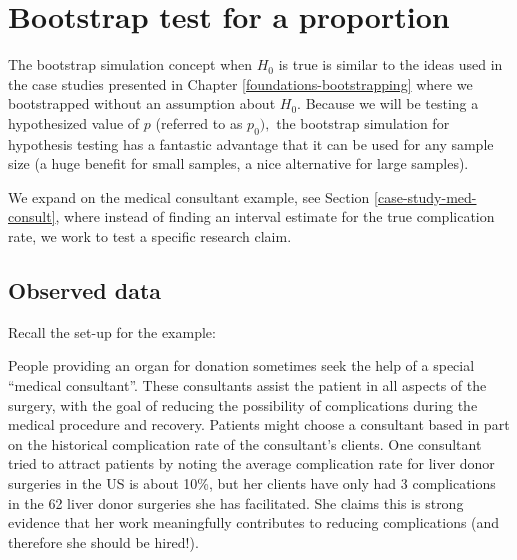 \documentclass[
  10pt,
  openany]{book}
\begin{document}
\vspace{-4mm}

\hypertarget{one-prop-null-boot}{%
\section{Bootstrap test for a proportion}\label{one-prop-null-boot}}

The bootstrap simulation concept when \(H_0\) is true is similar to the ideas used in the case studies presented in Chapter \ref{foundations-bootstrapping} where we bootstrapped without an assumption about \(H_0.\) Because we will be testing a hypothesized value of \(p\) (referred to as \(p_0),\) the bootstrap simulation for hypothesis testing has a fantastic advantage that it can be used for any sample size (a huge benefit for small samples, a nice alternative for large samples).

We expand on the medical consultant example, see Section \ref{case-study-med-consult}, where instead of finding an interval estimate for the true complication rate, we work to test a specific research claim.

\clearpage

\hypertarget{observed-data-7}{%
\subsection{Observed data}\label{observed-data-7}}

Recall the set-up for the example:

People providing an organ for donation sometimes seek the help of a special ``medical consultant''.
These consultants assist the patient in all aspects of the surgery, with the goal of reducing the possibility of complications during the medical procedure and recovery.
Patients might choose a consultant based in part on the historical complication rate of the consultant's clients.
One consultant tried to attract patients by noting the average complication rate for liver donor surgeries in the US is about 10\%, but her clients have only had 3 complications in the 62 liver donor surgeries she has facilitated.
She claims this is strong evidence that her work meaningfully contributes to reducing complications (and therefore she should be hired!).
\end{document}
